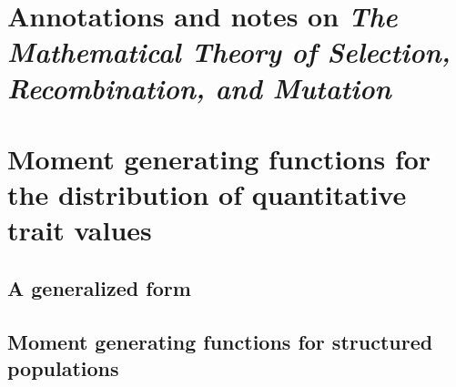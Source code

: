 \documentclass{article}
\begin{document}
\section{Annotations and notes on \emph{The Mathematical Theory of Selection, Recombination, and Mutation} \citep{burger2000mathematical}}
\subsection{\citet[chap. 4]{burger2000mathematical}}


\section{Moment generating functions for the distribution of quantitative trait values}
\subsection{A generalized form}

\subsection{Moment generating functions for structured populations}


\clearpage


\end{document}
